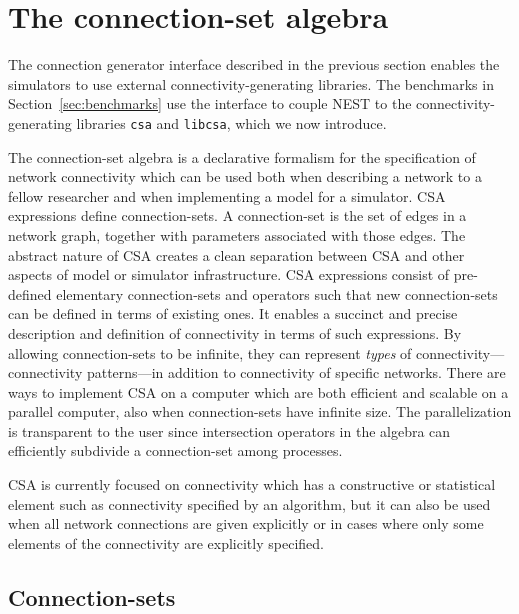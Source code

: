 \documentclass{frontiersSCNS} %
\begin{document}
\section{The connection-set algebra}\label{sec:csa}

The connection generator interface described in the previous section
enables the simulators to use external connectivity-generating
libraries. The benchmarks in Section~\ref{sec:benchmarks} use the
interface to couple NEST to the connectivity-generating libraries
\verb|csa| and \verb|libcsa|, which we now introduce.

The connection-set algebra is a declarative formalism for the
specification of network connectivity which can be used both when
describing a network to a fellow researcher and when implementing a
model for a simulator. CSA expressions define connection-sets. A
connection-set is the set of edges in a network graph, together with
parameters associated with those edges. The abstract nature of CSA
creates a clean separation between CSA and other aspects of model or
simulator infrastructure.  CSA expressions consist of pre-defined
elementary connection-sets and operators such that new connection-sets
can be defined in terms of existing ones. It enables a succinct and
precise description and definition of connectivity in terms of such
expressions. By allowing connection-sets to be infinite, they can
represent \emph{types} of connectivity---connectivity patterns---in
addition to connectivity of specific networks. There are ways to
implement CSA on a computer which are both efficient and scalable on a
parallel computer, also when connection-sets have infinite size. The
parallelization is transparent to the user since intersection
operators in the algebra can efficiently subdivide a connection-set
among processes.

CSA is currently focused on connectivity which has a constructive or
statistical element such as connectivity specified by an algorithm,
but it can also be used when all network connections are given
explicitly or in cases where only some elements of the connectivity
are explicitly specified.

\subsection{Connection-sets}
\end{document}
